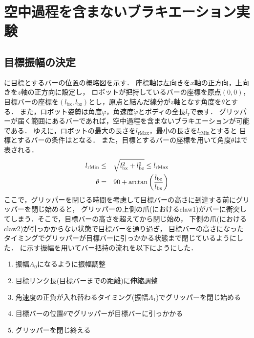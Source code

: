         \section{空中過程を含まないブラキエーション実験}

        \subsection{目標振幅の決定}
        に目標とするバーの位置の概略図を示す．
        座標軸は左向きを$x$軸の正方向，上向きを$z$軸の正方向に設定し，
        ロボットが把持しているバーの座標を原点$(0,0)$，
        目標バーの座標を$(l_{\mathrm{bx}},l_{\mathrm{bz}})$とし，原点と結んだ線分が$z$軸となす角度を$\theta$とする．
        また，ロボット姿勢は角度$\varphi$，角速度$\dot{\varphi}$とボディの全長$l_{\mathrm{r}}$で表す．
        グリッパーが届く範囲にあるバーであれば，空中過程を含まないブラキエーションが可能である．
        ゆえに，ロボットの最大の長さを$l_{\mathrm{rMax}}$，最小の長さを$l_{\mathrm{rMin}}$とすると
        目標とするバーの条件はとなる．
        また，目標とするバーの座標を用いて角度$\theta$はで表される．
        \begin{eqnarray}
                \equlabel{barRange}
                l_{\mathrm{rMin}} &\le& \sqrt{l_{\mathrm{bx}}^2+l_{\mathrm{bz}}^2} \le l_{\mathrm{rMax}}\\
                \equlabel{theta}
                \theta&=&90+\arctan{\left(\frac{l_{\mathrm{bz}}}{l_{\mathrm{bx}}}\right)}
                \end{eqnarray}  
        ここで，グリッパーを閉じる時間を考慮して目標バーの高さに到達する前にグリッパーを閉じ始めると，
        グリッパーの上側の爪(におけるclaw1)がバーに衝突してしまう．そこで，目標バーの高さを超えてから閉じ始め，
        下側の爪(におけるclaw2)が引っかからない状態で目標バーを通り過ぎ，
        目標バーの高さになったタイミングでグリッパーが目標バーに引っかかる状態まで閉じているようにした．
        に示す振幅を用いてバー把持の流れを以下にようにした．
        \begin{enumerate}
                \item 振幅$A_0$になるように振幅調整
                \item 目標リンク長(目標バーまでの距離)に伸縮調整
                \item 角速度の正負が入れ替わるタイミング(振幅$A_1$)でグリッパーを閉じ始める
                \item 目標バーの位置$\theta$でグリッパーが目標バーに引っかかる
                \item グリッパーを閉じ終える
        \end{enumerate}      
